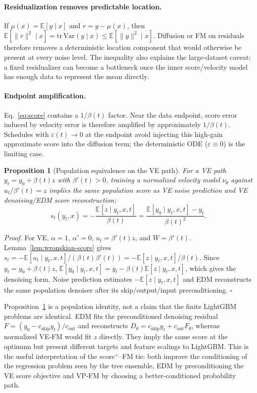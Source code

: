 \documentclass{uai2026}
\newcommand{\E}{\mathbb{E}}
\newcommand{\Var}{\mathrm{Var}}
\newtheorem{proposition}{Proposition}
\begin{document}
\paragraph{Residualization removes predictable location.} If $\mu(x)=\E[y\mid x]$ and $r=y-\mu(x)$, then $\E[\|r\|^2\mid x]=\mathrm{tr}\,\Var(y\mid x)\leq \E[\|y\|^2\mid x]$. Diffusion or FM on residuals therefore removes a deterministic location component that would otherwise be present at every noise level. The inequality also explains the large-dataset caveat: a fixed residualizer can become a bottleneck once the inner score/velocity model has enough data to represent the mean directly.

\paragraph{Endpoint amplification.} Eq.~\eqref{eq:score} contains a $1/\beta(t)$ factor. Near the data endpoint, score error induced by velocity error is therefore amplified by approximately $1/\beta(t)$. Schedules with $\varepsilon(t)\to 0$ at the endpoint avoid injecting this high-gain approximate score into the diffusion term; the deterministic ODE ($\varepsilon\equiv0$) is the limiting case.

\begin{proposition}[Population equivalence on the VE path]\label{prop:ve-equivalence}
For a VE path $y_t=y_0+\beta(t)z$ with $\beta'(t)>0$, training a normalized velocity model $\nu_\theta$ against $u_t/\beta'(t)=z$ implies the same population score as VE noise prediction and VE denoising/EDM score reconstruction:
\[
s_t(y_t,x)=-\frac{\E[z\mid y_t,x,t]}{\beta(t)}
          =\frac{\E[y_0\mid y_t,x,t]-y_t}{\beta(t)^2}.
\]
\end{proposition}
\emph{Proof.} For VE, $\alpha=1$, $\alpha'=0$, $u_t=\beta'(t)z$, and $W=\beta'(t)$. Lemma~\ref{lem:wronskian-score} gives $s_t=-\E[u_t\mid y_t,x,t]/(\beta(t)\beta'(t))=-\E[z\mid y_t,x,t]/\beta(t)$. Since $y_t=y_0+\beta(t)z$, $\E[y_0\mid y_t,x,t]=y_t-\beta(t)\E[z\mid y_t,x,t]$, which gives the denoising form. Noise prediction estimates $-\E[z\mid y_t,x,t]$ and EDM reconstructs the same population denoiser after its skip/output/input preconditioning. \hfill$\square$

Proposition~\ref{prop:ve-equivalence} is a population identity, not a claim that the finite LightGBM problems are identical. EDM fits the preconditioned denoising residual $F=(y_0-c_{\mathrm{skip}}y_t)/c_{\mathrm{out}}$ and reconstructs $D_\theta=c_{\mathrm{skip}}y_t+c_{\mathrm{out}}F_\theta$, whereas normalized VE-FM would fit $z$ directly. They imply the same score at the optimum but present different targets and feature scalings to LightGBM. This is the useful interpretation of the score$^+$--FM tie: both improve the conditioning of the regression problem seen by the tree ensemble, EDM by preconditioning the VE score objective and VP-FM by choosing a better-conditioned probability path.
\end{document}
